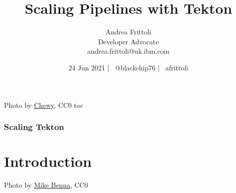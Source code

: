 \documentclass[aspectratio=169,11pt,hyperref={colorlinks=true}]{beamer}
\title{Scaling Pipelines with Tekton}
\date[24 Jun 2021]{24 Jun 2021 | \faTwitter ~@blackchip76 | \faGithub ~afrittoli}
\author[Andrea Frittoli]{
  Andrea Frittoli \\
  Developer Advocate \\
  andrea.frittoli@uk.ibm.com
}
\begin{document}
\begin{frame}
\titlepage{}
\end{frame}

\begin{lpicrblack}{%
  Photo by \href{https://unsplash.com/@chewy}{\underline{Chewy}}, CC0
  }%
  {%
  \tableofcontents
  }%
  {toc}
  \frametitle{Scaling Tekton}
\end{lpicrblack}


\section[Introduction]{Introduction}

\begin{sectionwithpic}{Photo by \href{https://unsplash.com/@mbenna}{\underline{Mike Benna}}, CC0}
\end{sectionwithpic}
\end{document}
